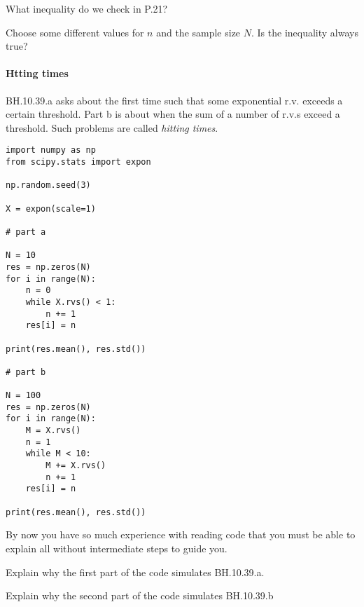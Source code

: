 \documentclass[assignments]{subfiles}
\begin{document}
\begin{exercise}
What inequality do we check in P.21?
\begin{solution}
\end{solution}
\end{exercise}

\begin{exercise}
Choose some different values for $n$ and the sample size $N$. Is the inequality always true?
\begin{solution}
\end{solution}
\end{exercise}

\paragraph{Htting times} BH.10.39.a asks about the first time such that some exponential r.v.
exceeds a certain threshold.
Part b is about when the sum of a number of r.v.s exceed a threshold.
Such problems are called \emph{hitting times}.

\begin{verbatim}
import numpy as np
from scipy.stats import expon

np.random.seed(3)

X = expon(scale=1)

# part a

N = 10
res = np.zeros(N)
for i in range(N):
    n = 0
    while X.rvs() < 1:
        n += 1
    res[i] = n

print(res.mean(), res.std())

# part b

N = 100
res = np.zeros(N)
for i in range(N):
    M = X.rvs()
    n = 1
    while M < 10:
        M += X.rvs()
        n += 1
    res[i] = n

print(res.mean(), res.std())
\end{verbatim}

By now you have so much experience with reading code that you must be able to explain all without intermediate steps to guide you.
\begin{exercise}
Explain why the first part of the code simulates BH.10.39.a.
\begin{solution}
\end{solution}
\end{exercise}

\begin{exercise}
Explain why the second part of the code simulates BH.10.39.b
\begin{solution}
\end{solution}
\end{exercise}
\end{document}
